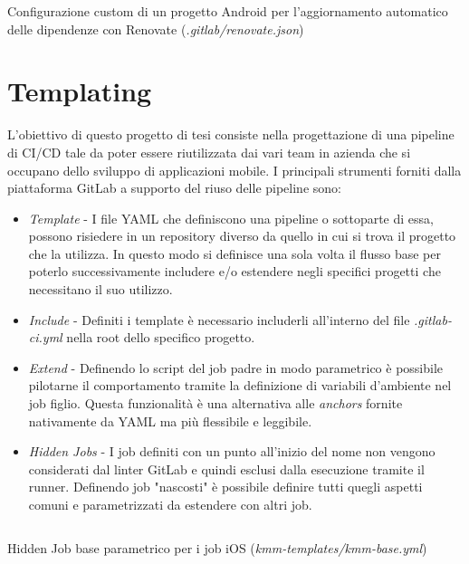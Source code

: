 \begin{listing}[H]
\inputminted{json}{code/4-renovacustom}
\caption{Configurazione custom di un progetto Android per l'aggiornamento automatico delle dipendenze con Renovate (\textit{.gitlab/renovate.json})}
\end{listing}

\section{Templating}
L'obiettivo di questo progetto di tesi consiste nella progettazione di una pipeline di CI/CD tale da poter essere riutilizzata dai vari team in azienda che si occupano dello sviluppo di applicazioni mobile. I principali strumenti forniti dalla piattaforma GitLab a supporto del riuso delle pipeline sono:
\begin{itemize}
    \item \textit{Template} - I file YAML che definiscono una pipeline o sottoparte di essa, possono risiedere in un repository diverso da quello in cui si trova il progetto che la utilizza. In questo modo si definisce una sola volta il flusso base per poterlo successivamente includere e/o estendere negli specifici progetti che necessitano il suo utilizzo.
    \item \textit{Include} - Definiti i template è necessario includerli all'interno del file \textit{.gitlab-ci.yml} nella root dello specifico progetto.
    \item \textit{Extend} - Definendo lo script del job padre in modo parametrico è possibile pilotarne il comportamento tramite la definizione di variabili d'ambiente nel job figlio. Questa funzionalità è una alternativa alle \textit{anchors} fornite nativamente da YAML ma più flessibile e leggibile.
    \item \textit{Hidden Jobs} - I job definiti con un punto all'inizio del nome non vengono considerati dal linter GitLab e quindi esclusi dalla esecuzione tramite il runner. Definendo job "nascosti" è possibile definire tutti quegli aspetti comuni e parametrizzati da estendere con altri job.
\end{itemize}

\begin{listing}[H]
\inputminted{yaml}{code/4-templating2}
\caption{Hidden Job base parametrico per i job iOS (\textit{kmm-templates/kmm-base.yml})}
\end{listing}

